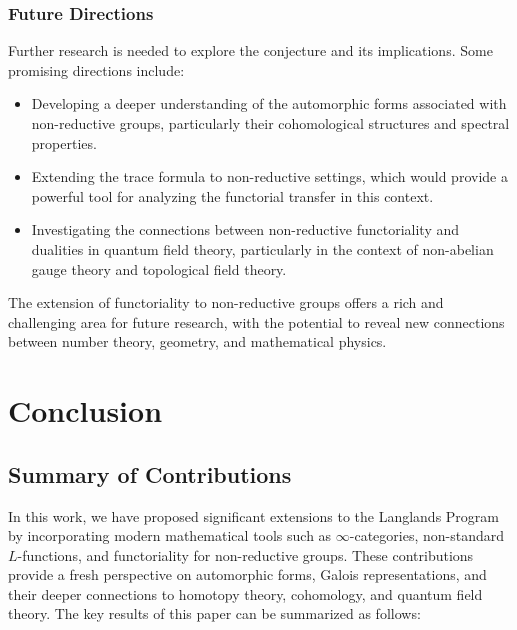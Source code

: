 \documentclass{article}
\theoremstyle{remark}
\begin{document}
\subsubsection{Future Directions}

Further research is needed to explore the conjecture and its implications. Some promising directions include:
\begin{itemize}
    \item Developing a deeper understanding of the automorphic forms associated with non-reductive groups, particularly their cohomological structures and spectral properties.
    \item Extending the trace formula to non-reductive settings, which would provide a powerful tool for analyzing the functorial transfer in this context.
    \item Investigating the connections between non-reductive functoriality and dualities in quantum field theory, particularly in the context of non-abelian gauge theory and topological field theory.
\end{itemize}

The extension of functoriality to non-reductive groups offers a rich and challenging area for future research, with the potential to reveal new connections between number theory, geometry, and mathematical physics.

\section{Conclusion}

\subsection{Summary of Contributions}

In this work, we have proposed significant extensions to the Langlands Program by incorporating modern mathematical tools such as $\infty$-categories, non-standard $L$-functions, and functoriality for non-reductive groups. These contributions provide a fresh perspective on automorphic forms, Galois representations, and their deeper connections to homotopy theory, cohomology, and quantum field theory. The key results of this paper can be summarized as follows:
\end{document}
